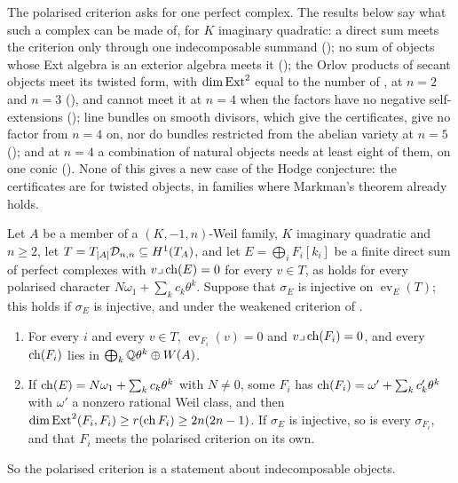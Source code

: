 The polarised criterion asks for one perfect complex. The results below say
what such a complex can be made of, for $K$ imaginary quadratic: a direct sum
meets the criterion only through one indecomposable summand
(); no sum of objects whose Ext algebra is an
exterior algebra meets it (); the Orlov products of
secant objects meet its twisted form, with $\dim\operatorname{Ext}^{2}$ equal to the number
of , at $n=2$ and $n=3$ (), and
cannot meet it at $n=4$ when the factors have no negative self-extensions
(); line bundles on smooth divisors, which give the
certificates, give no factor from $n=4$ on, nor do bundles restricted from
the abelian variety at $n=5$ (); and at $n=4$ a combination of natural objects needs
at least eight of them, on one conic (). None of
this gives a new case of the Hodge conjecture: the certificates are for
twisted objects, in families where Markman's theorem already holds.

\begin{lemma}
\label{lem:p2primesummands}
Let $A$ be a member of a $(K,-1,n)$-Weil family, $K$ imaginary quadratic and
$n\ge2$, let $T=T_{[A]}\mathcal{D}_{n,n}\subseteq H^{1}(T_{A})$, and let
$E=\bigoplus_{i}F_{i}[k_{i}]$ be a finite direct sum of perfect complexes with
$v\lrcorner\operatorname{ch}(E)=0$ for every $v\in T$, as holds for every polarised character
$N\omega_{1}+\sum_{k}c_{k}\theta^{k}$. Suppose that $\sigma_{E}$ is injective on
$\operatorname{ev}_{E}(T)$; this holds if $\sigma_{E}$ is injective, and under
the weakened criterion of \cite[Question 11.4]{Mar25b}.
\begin{enumerate}[label=\textup{(\roman*)},leftmargin=2.6em,itemsep=2pt]
\item For every $i$ and every $v\in T$, $\operatorname{ev}_{F_{i}}(v)=0$ and
  $v\lrcorner\operatorname{ch}(F_{i})=0$, and every $\operatorname{ch}(F_{i})$ lies in
  $\bigoplus_{k}\mathbb{Q}\theta^{k}\oplus W(A)$.
\item If $\operatorname{ch}(E)=N\omega_{1}+\sum_{k}c_{k}\theta^{k}$ with $N\ne0$, some
  $F_{i}$ has $\operatorname{ch}(F_{i})=\omega'+\sum_{k}c'_{k}\theta^{k}$ with $\omega'$ a
  nonzero rational Weil class, and then
  $\dim\operatorname{Ext}^{2}(F_{i},F_{i})\ge r(\operatorname{ch} F_{i})\ge2n(2n-1)$. If $\sigma_{E}$ is
  injective, so is every $\sigma_{F_{i}}$, and that $F_{i}$ meets the polarised
  criterion on its own.
\end{enumerate}
So the polarised criterion is a statement about indecomposable objects.
\end{lemma}

